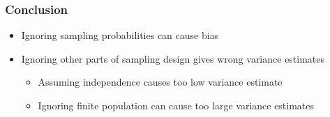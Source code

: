 \documentclass{beamer}
\begin{document}
\begin{frame}
  \frametitle{Conclusion}

  \begin{itemize}
  \item Ignoring sampling probabilities can cause bias
  \item Ignoring other parts of sampling design gives wrong variance estimates
    \begin{itemize}
    \item Assuming independence causes too low variance estimate
    \item Ignoring finite population can cause too large variance estimates
    \end{itemize}
  \end{itemize}
  
\end{frame}
\end{document}
